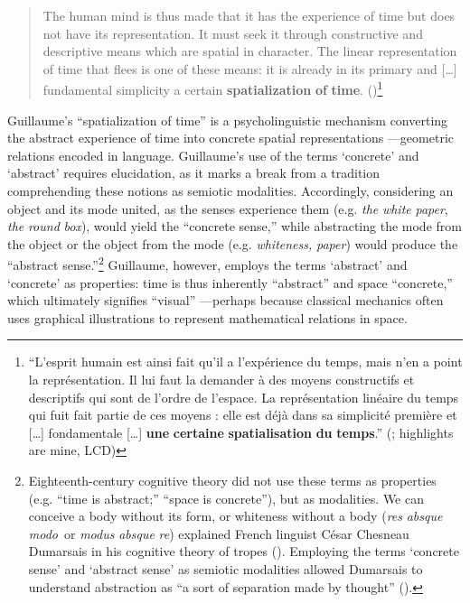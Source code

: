 \documentclass[output=paper]{langsci/langscibook}
\begin{document}
\begin{quote}
    The human mind is thus made that it has the experience of time but does not have its representation. It must seek it through constructive and descriptive means which are spatial in character. The linear representation of time that flees is one of these means: it is already in its primary and […] fundamental simplicity a certain \textbf{spatialization} \textbf{of} \textbf{time}. (\citealt[17]{guillaume_larchitectonique_1965})\footnote{“L'esprit humain est ainsi fait qu'il a l'expérience du temps, mais n'en a point la représentation. Il lui faut la demander à des moyens constructifs et descriptifs qui sont de l'ordre de l'espace. La représentation linéaire du temps qui fuit fait partie de ces moyens : elle est déjà dans sa simplicité première et […] fondamentale […] \textbf{une} \textbf{certaine} \textbf{spatialisation} \textbf{du} \textbf{temps}.” (\citealt[17]{guillaume_larchitectonique_1965}; highlights are mine, LCD)}
\end{quote}

Guillaume’s “spatialization of time” is a psycholinguistic mechanism converting the abstract experience of time into concrete spatial representations —geometric relations encoded in language. Guillaume’s use of the terms ‘concrete’ and ‘abstract’ requires elucidation, as it marks a break from a tradition comprehending these notions as semiotic modalities. Accordingly, considering an object and its mode united, as the senses experience them (e.g. \textit{the} \textit{white} \textit{paper}, \textit{the} \textit{round} \textit{box}), would yield the “concrete sense,” while abstracting the mode from the object or the object from the mode (e.g. \textit{whiteness,} \textit{paper}) would produce the “abstract sense.”\footnote{Eighteenth-century cognitive theory did not use these terms as properties (e.g. “time is abstract;” “space is concrete”), but as modalities. We can conceive a body without its form, or whiteness without a body (\textit{res} \textit{absque} \textit{modo}~or \textit{modus} \textit{absque} \textit{re}) explained French linguist César Chesneau Dumarsais in his cognitive theory of tropes (\citeyear{dumarsais_tropes_1730}). Employing the terms ‘concrete sense’ and ‘abstract sense’ as semiotic modalities allowed Dumarsais to understand abstraction as “a sort of separation made by thought” (\citeyear[260]{dumarsais_tropes_1730}).} Guillaume, however, employs the terms ‘abstract’ and ‘concrete’ as properties: time is thus inherently “abstract” and space “concrete,” which ultimately signifies “visual” —perhaps because classical mechanics often uses graphical illustrations to represent mathematical relations in space.
\end{document}
